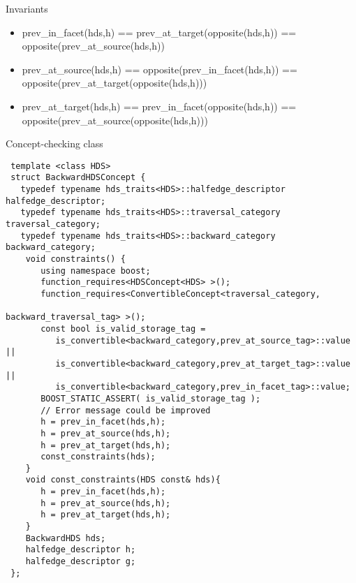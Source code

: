 \begin{Desc}
\item[Invariants ]\begin{itemize}
\item prev\_\-in\_\-facet(hds,h) == prev\_\-at\_\-target(opposite(hds,h)) == opposite(prev\_\-at\_\-source(hds,h))\item prev\_\-at\_\-source(hds,h) == opposite(prev\_\-in\_\-facet(hds,h)) == opposite(prev\_\-at\_\-target(opposite(hds,h)))\item prev\_\-at\_\-target(hds,h) == prev\_\-in\_\-facet(opposite(hds,h)) == opposite(prev\_\-at\_\-source(opposite(hds,h)))\end{itemize}
\end{Desc}
\begin{Desc}
\item[Concept-checking class]

\begin{Code}\begin{verbatim} template <class HDS> 
 struct BackwardHDSConcept {
   typedef typename hds_traits<HDS>::halfedge_descriptor halfedge_descriptor; 
   typedef typename hds_traits<HDS>::traversal_category traversal_category;
   typedef typename hds_traits<HDS>::backward_category backward_category;
    void constraints() {
       using namespace boost;
       function_requires<HDSConcept<HDS> >();
       function_requires<ConvertibleConcept<traversal_category,
                                                backward_traversal_tag> >();  
       const bool is_valid_storage_tag =
          is_convertible<backward_category,prev_at_source_tag>::value ||
          is_convertible<backward_category,prev_at_target_tag>::value ||
          is_convertible<backward_category,prev_in_facet_tag>::value;
       BOOST_STATIC_ASSERT( is_valid_storage_tag ); 
       // Error message could be improved
       h = prev_in_facet(hds,h);
       h = prev_at_source(hds,h);
       h = prev_at_target(hds,h);
       const_constraints(hds);
    }
    void const_constraints(HDS const& hds){
       h = prev_in_facet(hds,h);
       h = prev_at_source(hds,h);
       h = prev_at_target(hds,h);
    }
    BackwardHDS hds;
    halfedge_descriptor h;
    halfedge_descriptor g;
 };
\end{verbatim}\end{Code}

 \end{Desc}
